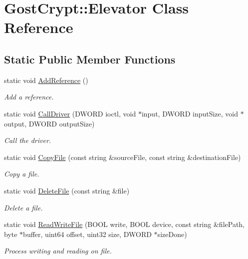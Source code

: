 \hypertarget{class_gost_crypt_1_1_elevator}{}\section{Gost\+Crypt\+:\+:Elevator Class Reference}
\label{class_gost_crypt_1_1_elevator}
\subsection*{Static Public Member Functions}
\begin{DoxyCompactItemize}
\item 
static void \hyperlink{class_gost_crypt_1_1_elevator_ae5fa1c4df5968245d213dd0a3cc3d93f}{Add\+Reference} ()
\begin{DoxyCompactList}\small\item\em Add a reference. \end{DoxyCompactList}\item 
static void \hyperlink{class_gost_crypt_1_1_elevator_ab7e6ae353776bbd40daa2b4f55f0dc21}{Call\+Driver} (D\+W\+O\+RD ioctl, void $\ast$input, D\+W\+O\+RD input\+Size, void $\ast$output, D\+W\+O\+RD output\+Size)
\begin{DoxyCompactList}\small\item\em Call the driver. \end{DoxyCompactList}\item 
static void \hyperlink{class_gost_crypt_1_1_elevator_a96467eb7f4d481dc8cc88a905425010d}{Copy\+File} (const string \&source\+File, const string \&destination\+File)
\begin{DoxyCompactList}\small\item\em Copy a file. \end{DoxyCompactList}\item 
static void \hyperlink{class_gost_crypt_1_1_elevator_a7436d3b36f4775314d51ea0cc3ec13f3}{Delete\+File} (const string \&file)
\begin{DoxyCompactList}\small\item\em Delete a file. \end{DoxyCompactList}\item 
static void \hyperlink{class_gost_crypt_1_1_elevator_af444333e649b29c3640242ded59cb673}{Read\+Write\+File} (B\+O\+OL write, B\+O\+OL device, const string \&file\+Path, byte $\ast$buffer, uint64 offset, uint32 size, D\+W\+O\+RD $\ast$size\+Done)
\begin{DoxyCompactList}\small\item\em Process writing and reading on file. \end{DoxyCompactList}\item 

\end{DoxyCompactItemize}
